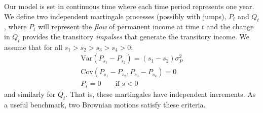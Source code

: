 \documentclass[titlepage]{\econtex}\newcommand{\texname}{ConsumptionHeterogeneity}
\begin{document}
Our model is set in continuous time where each time period represents one year. We define two independent martingale processes (possibly with jumps), $P_t$ and $Q_t$, where $P_t$ will represent the \textit{flow} of permanent income at time $t$ and the change in $Q_t$ provides the transitory \textit{impulses} that generate the transitory income. We assume that for all  $s_1>s_2>s_3>s_4>0$:
\begin{align*}
\mathrm{Var}(P_{s_1}-P_{s_2})=(s_1-s_2)\sigma_P^2 \\
\mathrm{Cov}(P_{s_1}-P_{s_2},P_{s_3}-P_{s_4}) = 0 \\
P_s = 0 \qquad \text{if } s<0
\end{align*}
and similarly for $Q_t$. That is, these martingales have independent increments. As a useful benchmark, two Brownian motions satisfy these criteria.
\end{document}

